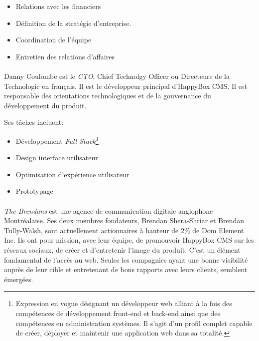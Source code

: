 \documentclass[11pt, a4paper ]{article}
\begin{document}
\begin{spacing}{1.5}
		\begin{itemize}
			\item
				Relations avec les financiers
			\item
				Définition de la stratégie d'entreprise.
			\item
				Coordination de l'équipe
			\item
				Entretien des relations d'affaires
		\end{itemize}

\paragraph{}
Danny Coulombe est le \emph{CTO}, Chief Technolgy Officer ou Directeure de la Technologie en français. Il est le développeur principal d'HappyBox CMS. Il est responsable des orientations technologiques et de la gouvernance du développement du produit.

	Ses tâches incluent:

		\begin{itemize}

			\item
				Développement \emph{Full Stack\footnote{Expression en vogue désignant un développeur web alliant à la fois des compétences de développement front-end et back-end ainsi que des compétences en administration systèmes. Il s'agit d'un profil complet capable de créer, déployer et maintenir une application web dans sa totalité.}}
			\item
				Design interface utilisateur
			\item
				Optimisation d'expérience utilisateur
			\item
				Prototypage

		\end{itemize}



\paragraph{} %
	\emph{The Brendans} est une agence de communication digitale anglophone Montréalaise. Ses deux membres fondateurs, Brendan Shera-Shriar et Brendan Tully-Walsh, sont actuellement actionnaires à hauteur de 2\% de Dom Element Inc. Ils ont pour mission, avec leur équipe, de promouvoir HappyBox CMS sur les réseaux sociaux, de créer et d'entretenir l'image du produit.
	C'est un élément fondamental de l'accès au web. Seules les compagnies ayant une bonne visibilité auprès de leur cible et entretenant de bons rapports avec leurs clients, semblent émergées.


\end{spacing}
\end{document}
